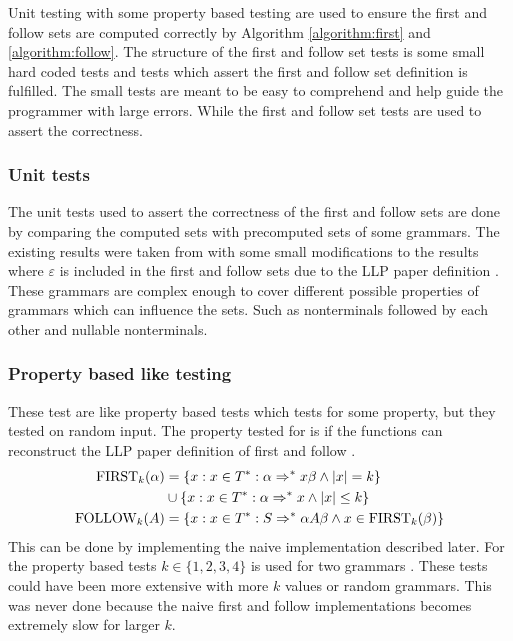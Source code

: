 Unit testing with some property based testing are used to ensure the first and follow sets are computed correctly by Algorithm \ref{algorithm:first} and \ref{algorithm:follow}. The structure of the first and follow set tests is some small hard coded tests and tests which assert the first and follow set definition is fulfilled. The small tests are meant to be easy to comprehend and help guide the programmer with large errors. While the first and follow set tests are used to assert the correctness.

\subsubsection{Unit tests}
The unit tests used to assert the correctness of the first and follow sets are done by comparing the computed sets with precomputed sets of some grammars. The existing results were taken from \cite[58, 62, 63, 65]{Mogensen} with some small modifications to the results where $\varepsilon$ is included in the first and follow sets due to the LLP paper definition \cite[5]{Vagner2007}. These grammars are complex enough to cover different possible properties of grammars which can influence the sets. Such as nonterminals followed by each other and nullable nonterminals.

\subsubsection{Property based like testing}
These test are like property based tests which tests for some property, but they tested on random input. The property tested for is if the functions can reconstruct the LLP paper definition of first and follow \cite[5]{Vagner2007}.
\begin{align*}
    \text{FIRST}_k(\alpha) &= \{x : x \in T^* : \alpha \Rightarrow^* x \beta \land |x| = k\} \\ 
    \, &\cup \{x : x \in T^* : \alpha \Rightarrow^* x \land |x| \leq k\} \\
    \text{FOLLOW}_k(A) &= \{x : x \in T^* : S \Rightarrow^* \alpha A \beta \land x \in \text{FIRST}_k(\beta)\}
\end{align*}
This can be done by implementing the naive implementation described later. For the property based tests $k \in \{1, 2, 3, 4\}$ is used for two grammars \cite[62, 63]{Mogensen}. These tests could have been more extensive with more $k$ values or random grammars. This was never done because the naive first and follow implementations becomes extremely slow for larger $k$.

